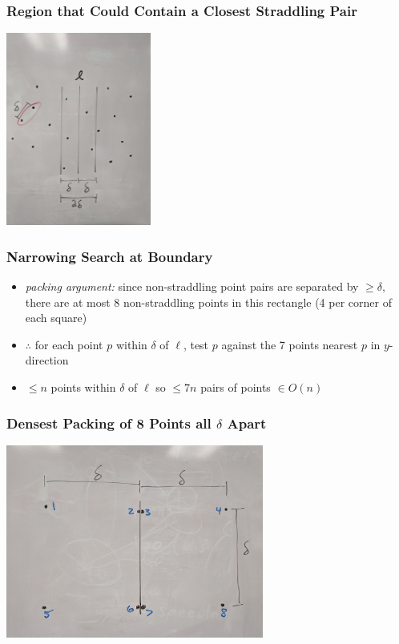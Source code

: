 \documentclass{beamer}
\begin{document}
\begin{frame} \frametitle{Region that Could Contain a Closest Straddling Pair}
  \begin{center}
    \includegraphics[height=2.5in]{closest-pair-straddling.jpg}
  \end{center}
\end{frame}

\begin{frame} \frametitle{Narrowing Search at Boundary}
\begin{itemize}
  \item \emph{packing argument:} since non-straddling point pairs are separated by $\geq \delta,$
    there are at most 8 non-straddling points in this rectangle (4 per corner of each square)
  \item $\therefore$ for each point $p$ within $\delta$ of $\ell$, test $p$ against
    the 7 points nearest $p$ in $y$-direction
  \item $\leq n$ points within $\delta$ of $\ell$ so $\leq 7n$ pairs of points $\in O(n)$
\end{itemize}
\end{frame}

\begin{frame} \frametitle{Densest Packing of 8 Points all $\delta$ Apart}
  \begin{center}
    \includegraphics[height=2.5in]{closest-pair-packing.jpg}
  \end{center}
\end{frame}
\end{document}
